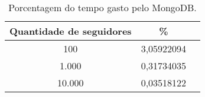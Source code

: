 \begin{table}[H]
    \centering
    \caption[Porcentagem do tempo gasto pelo MongoDB]{Porcentagem do tempo gasto pelo MongoDB.\label{tab:percent_mongo}}
    \begin{tabular}{ccc}
        \hline
            Quantidade de seguidores & \% \\
        \hline
            100  &   3,05922094 \\
            1.000  & 0,31734035 \\
            10.000 & 0,03518122 \\
        \hline
    \end{tabular}
\end{table}
